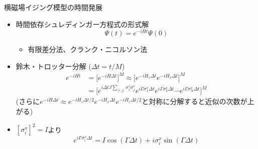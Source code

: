 \begin{frame}[t,fragile]{横磁場イジング模型の時間発展}
  \begin{itemize}
  \item 時間依存シュレディンガー方程式の形式解
    \[
    \Psi(t) = e^{-iHt} \Psi(0)
    \]
    \begin{itemize}
    \item 有限差分法、クランク・ニコルソン法
    \end{itemize}
  \item 鈴木・トロッター分解 ($\Delta t = t / M$)
    \begin{align*}
      e^{-iHt} &= \big[ e^{-iH\Delta t} \big]^M \approx \big[ e^{-iH_z\Delta t} e^{-iH_x\Delta t} \big]^M \\
      &= \big[ e^{i\Delta t J \sum_{\langle i,j \rangle} \sigma_i^z \sigma_j^z} e^{i\Gamma \sigma_1^x\Delta t} e^{i\Gamma \sigma_2^x\Delta t} \cdots e^{i\Gamma \sigma_N^x\Delta t} \big]^M
    \end{align*}
    (さらに$e^{-iH\Delta t} \approx e^{-iH_z\Delta t/2} e^{-iH_x\Delta t} e^{-iH_z\Delta t/2}$と対称に分解すると近似の次数が上がる)
  \item $[\sigma_i^x]^2 = I$より
    \[
    e^{i\Gamma \sigma_i^x\Delta t} = I \cos (\Gamma\Delta t) + i \sigma_i^x \sin (\Gamma\Delta t)
    \]
  \end{itemize}
\end{frame}

